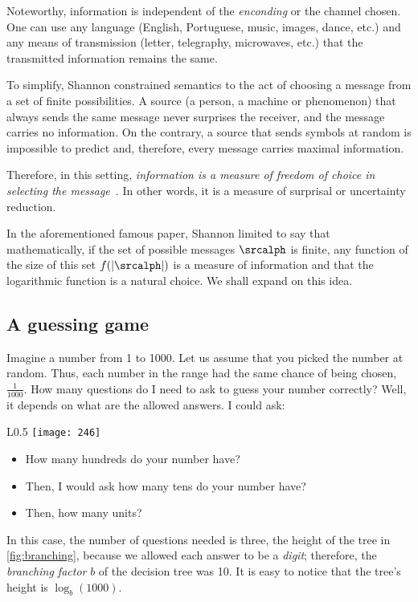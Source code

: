 Noteworthy, information is independent of the \emph{enconding} or the channel chosen. One can use any language (English, Portuguese, music, images, dance, etc.) and any means of transmission (letter, telegraphy, microwaves, etc.) that the transmitted information remains the same.

To simplify, Shannon constrained semantics to the act of choosing a message from a set of finite possibilities. A source (a person, a machine or phenomenon) that always sends the same message never surprises the receiver, and the message carries no information. On the contrary, a source that sends symbols at random is impossible to predict and, therefore, every message carries maximal information.

Therefore, in this setting, \emph{information is a measure of freedom of choice in selecting the message}~\cite[p.100]{shannon:1949}. In other words, it is a measure of surprisal or uncertainty reduction.

In the aforementioned famous paper, Shannon limited to say that mathematically, if the set of possible messages \(\srcalph\)  is finite, any function of the size of this set \(f(|\srcalph|)\) is a measure of information and that the logarithmic function is a natural choice. We shall expand on this idea.

\subsection{A guessing game}\label{guessing_game} Imagine a number from 1 to 1000. Let us assume that you picked the number at random. Thus, each number in the range had the same chance of being chosen, \(\frac{1}{1000}\). How many questions do I need to ask to guess your number correctly? Well, it depends on what are the allowed answers. I could ask:
\begin{wrapfigure}
	{L}{0.5
	\textwidth} \centering
	\texttt{[image: 246]}
	\caption{Branching factor of 10 to find 246.}\label{fig:branching} \end{wrapfigure}
\begin{itemize}
	\item How many hundreds do your number have?
	\item Then, I would ask how many tens do your number have?
	\item Then, how many units?
\end{itemize}

In this case, the number of questions needed is three, the height of the tree in \cref{fig:branching}, because we allowed each answer to be a \emph{digit}; therefore, the \emph{branching factor} \(b\) of the decision tree was 10. It is easy to notice that the tree's height is \(\log_b (1000)\).

